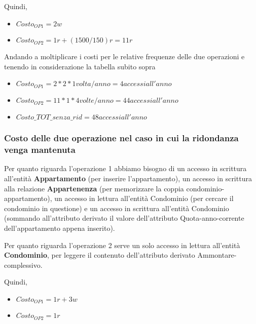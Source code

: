 Quindi,

\begin{samepage}
	\begin{itemize}
		\item $Costo_{OP1} = 2w$
		\item $Costo_{OP2} = 1r + (1500/150)r = 11r$
	\end{itemize}
\end{samepage}

Andando a moltiplicare i costi per le relative frequenze delle due operazioni e tenendo in considerazione la tabella subito sopra


\begin{samepage}
	\begin{itemize}
		\item $Costo_{OP1} = 2 * 2 * 1 volta/anno = 4 accessi all'anno$
		\item $Costo_{OP2} = 11 * 1 * 4 volte/anno = 44 accessi all'anno$
		\item $Costo\_TOT\_senza\_rid = 48 accessi all'anno$
	\end{itemize}
\end{samepage}

\subsubsection{Costo delle due operazione nel caso in cui la ridondanza venga mantenuta}

Per quanto riguarda l'operazione 1 abbiamo bisogno di un accesso in scrittura all'entità \textbf{Appartamento} (per inserire l'appartamento), un accesso in scrittura alla relazione \textbf{Appartenenza} (per memorizzare la coppia condominio-appartamento), un accesso in lettura all'entità Condominio (per cercare il condominio in questione) e un accesso in scrittura all'entità Condominio (sommando all'attributo derivato il valore dell'attributo Quota-anno-corrente dell'appartamento appena inserito).

Per quanto riguarda l'operazione 2 serve un solo accesso in lettura all'entità \textbf{Condominio}, per leggere il contenuto dell'attributo derivato Ammontare-complessivo.

Quindi,

\begin{samepage}
	\begin{itemize}
		\item $Costo_{OP1} = 1r + 3w$
		\item $Costo_{OP2} = 1r$
	\end{itemize}
\end{samepage}

